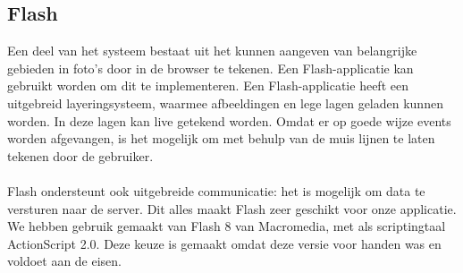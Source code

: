 \subsection{Flash}
Een deel van het systeem bestaat uit het kunnen aangeven van belangrijke gebieden in foto's door in de browser te tekenen. 
Een Flash-applicatie kan gebruikt worden om dit te implementeren. 
Een Flash-applicatie heeft een uitgebreid layeringsysteem, waarmee afbeeldingen en lege lagen geladen kunnen worden. 
In deze lagen kan live getekend worden. 
Omdat er op goede wijze events worden afgevangen, is het mogelijk om met behulp van de muis lijnen te laten tekenen door de gebruiker.
\\
\\
Flash ondersteunt ook uitgebreide communicatie: het is mogelijk om data te versturen naar de server. 
Dit alles maakt Flash zeer geschikt voor onze applicatie. 
We hebben gebruik gemaakt van Flash 8 van Macromedia, met als scriptingtaal ActionScript 2.0. 
Deze keuze is gemaakt omdat deze versie voor handen was en voldoet aan de eisen.
